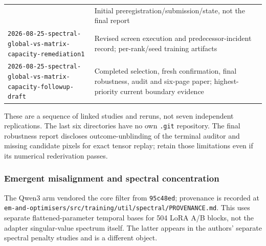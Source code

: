 \documentclass[
  british,
  10pt,
  a4paper,
]{article}
\begin{document}
{\begin{longtable}[]{@{}
  >{\raggedright\arraybackslash}p{}
  >{\raggedright\arraybackslash}p{}@{}}
& Initial
preregistrat\allowbreak{}ion/\allowbreak{}submission/\allowbreak{}state,\allowbreak{}
not the final report \\
\texttt{2026-\allowbreak{}08-\allowbreak{}25-\allowbreak{}spectral-\allowbreak{}global-\allowbreak{}vs-\allowbreak{}matrix-\allowbreak{}capacity-\allowbreak{}remediation1\allowbreak{}}
& Revised screen execution and predecessor-\allowbreak{}incident record;
per-\allowbreak{}rank/\allowbreak{}seed training artifacts \\
\texttt{2026-\allowbreak{}08-\allowbreak{}25-\allowbreak{}spectral-\allowbreak{}global-\allowbreak{}vs-\allowbreak{}matrix-\allowbreak{}capacity-\allowbreak{}followup-\allowbreak{}draft}
& Completed selection, fresh confirmation\allowbreak{},\allowbreak{}
final robustness,\allowbreak{} audit and six-page paper;
highest-\allowbreak{}priority current boundary evidence \\
\end{longtable}
}

These are a sequence of linked studies and reruns, not seven independent
replications\allowbreak{}.\allowbreak{} The last six directories have no
own \texttt{.git} repository.\allowbreak{} The final robustness report
discloses outcome-\allowbreak{}unblinding of the terminal auditor and
missing candidate pixels for exact tensor replay; retain those
limitations even if its numerical rederivation passes.

\subsubsection{Emergent misalignment and spectral
concentration}\label{repository-inventory--emergent-misalignment-and-spectral-concentration}

The Qwen3 arm vendored the core filter from \texttt{95c48ed}; provenance
is recorded at
\texttt{em-\allowbreak{}and-\allowbreak{}optimisers/\allowbreak{}src/\allowbreak{}training/\allowbreak{}util/\allowbreak{}spectral/\allowbreak{}PROVENANCE.\allowbreak{}md}.
This uses separate flattened-\allowbreak{}parameter temporal bases for
504 LoRA A/B blocks, not the adapter singular-\allowbreak{}value
spectrum itself. The latter appears in the authors' separate spectral
penalty studies and is a different object.
\end{document}
